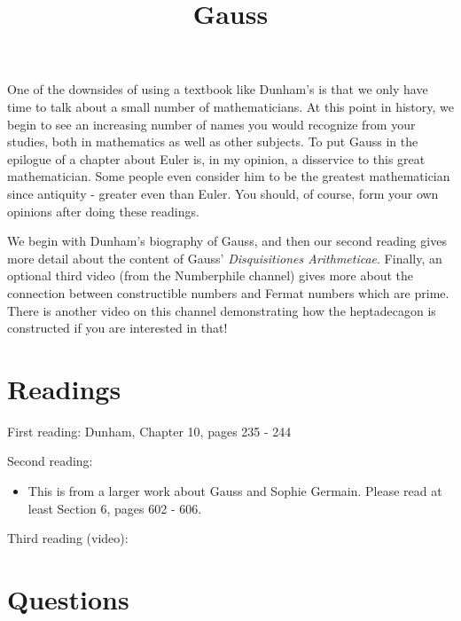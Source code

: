 \documentclass[nooutcomes]{ximera}
\title{Gauss}
\begin{document}
\begin{abstract}
    
\end{abstract}
\maketitle



One of the downsides of using a textbook like Dunham's is that we only have time to talk about a small number of mathematicians.  At this point in history, we begin to see an increasing number of names you would recognize from your studies, both in mathematics as well as other subjects.  To put Gauss in the epilogue of a chapter about Euler is, in my opinion, a disservice to this great mathematician.  Some people even consider him to be the greatest mathematician since antiquity - greater even than Euler.  You should, of course, form your own opinions after doing these readings.

We begin with Dunham's biography of Gauss, and then our second reading gives more detail about the content of Gauss' {\em Disquisitiones Arithmeticae}.   Finally, an optional third video (from the Numberphile channel) gives more about the connection between constructible numbers and Fermat numbers which are prime. There is another video on this channel demonstrating how the heptadecagon is constructed if you are interested in that!


\section{Readings}
First reading: Dunham, Chapter 10, pages 235 - 244

Second reading: 
\begin{itemize}
 \item This is from a larger work about Gauss and Sophie Germain. Please read at least Section 6, pages 602 - 606.
\end{itemize}

Third reading (video): 



\section{Questions}
\end{document}
